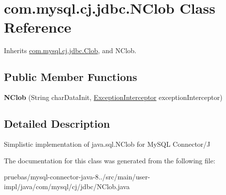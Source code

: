 \hypertarget{classcom_1_1mysql_1_1cj_1_1jdbc_1_1_n_clob}{}\section{com.\+mysql.\+cj.\+jdbc.\+N\+Clob Class Reference}
\label{classcom_1_1mysql_1_1cj_1_1jdbc_1_1_n_clob}


Inherits \mbox{\hyperlink{classcom_1_1mysql_1_1cj_1_1jdbc_1_1_clob}{com.\+mysql.\+cj.\+jdbc.\+Clob}}, and N\+Clob.

\subsection*{Public Member Functions}
\begin{DoxyCompactItemize}
\item 
\mbox{\label{classcom_1_1mysql_1_1cj_1_1jdbc_1_1_n_clob_ac77bcda688f15621d88c0cb5dbb2ac47}} 
{\bfseries N\+Clob} (String char\+Data\+Init, \mbox{\hyperlink{interfacecom_1_1mysql_1_1cj_1_1exceptions_1_1_exception_interceptor}{Exception\+Interceptor}} exception\+Interceptor)
\end{DoxyCompactItemize}


\subsection{Detailed Description}
Simplistic implementation of java.\+sql.\+N\+Clob for My\+S\+QL Connector/J 

The documentation for this class was generated from the following file\+:\begin{DoxyCompactItemize}
\item 
pruebas/mysql-\/connector-\/java-\/8../src/main/user-\/impl/java/com/mysql/cj/jdbc/N\+Clob.\+java\end{DoxyCompactItemize}
